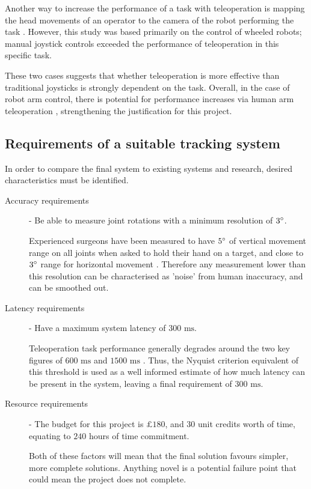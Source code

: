     Another way to increase the performance of a task with teleoperation is mapping the head movements of an operator to the camera of the robot performing the task \cite{ref:teleopanalysis}.
    However, this study was based primarily on the control of wheeled robots; manual joystick controls exceeded the performance of teleoperation in this specific task.
    
    These two cases suggests that whether teleoperation is more effective than traditional joysticks is strongly dependent on the task.
    Overall, in the case of robot arm control, there is potential for performance increases via human arm teleoperation \cite{ref:Zhou_Yang_Wang_Dong_2025}, strengthening the justification for this project.

  \subsection{Requirements of a suitable tracking system}
    In order to compare the final system to existing systems and research, desired characteristics must be identified.
    
    \begin{description}
      \item[Accuracy requirements] - Be able to measure joint rotations with a minimum resolution of \(3 ^\circ\). 
      
      Experienced surgeons have been measured to have \(5 ^\circ\) of vertical movement range on all joints when asked to hold their hand on a target, and close to \(3 ^\circ\) range for horizontal movement \cite{ref:movementrange}.
      Therefore any measurement lower than this resolution can be characterised as 'noise' from human inaccuracy, and can be smoothed out.
      \item[Latency requirements] - Have a maximum system latency of \(300 \text{ ms}\). 
      
      Teleoperation task performance generally degrades around the two key figures of \(600 \text{ ms}\) and \(1500 \text{ ms}\) \cite{ref:teleoplatency}.
      Thus, the Nyquist criterion equivalent of this threshold is used as a well informed estimate of how much latency can be present in the system, leaving a final requirement of \(300 \text{ ms}\).
      
      \item[Resource requirements] -  The budget for this project is \(£180\), and \(30\) unit credits worth of time, equating to \(240\) hours of time commitment.
      
      Both of these factors will mean that the final solution favours simpler, more complete solutions. 
      Anything novel is a potential failure point that could mean the project does not complete.  
    \end{description}

